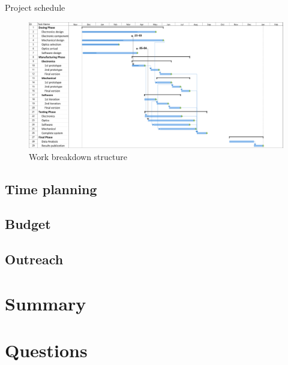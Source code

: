 \documentclass[11pt, aspectratio=169]{beamer}
\begin{document}
\begin{frame}{Project schedule}
    \begin{figure}
        \includegraphics[width=0.98\linewidth]{images/gantt.png}
        \caption{Work breakdown structure}
    \end{figure}
\end{frame}

\subsection{Time planning}
\subsection{Budget}
\subsection{Outreach}

\section{Summary}

\section{Questions}
\end{document}
